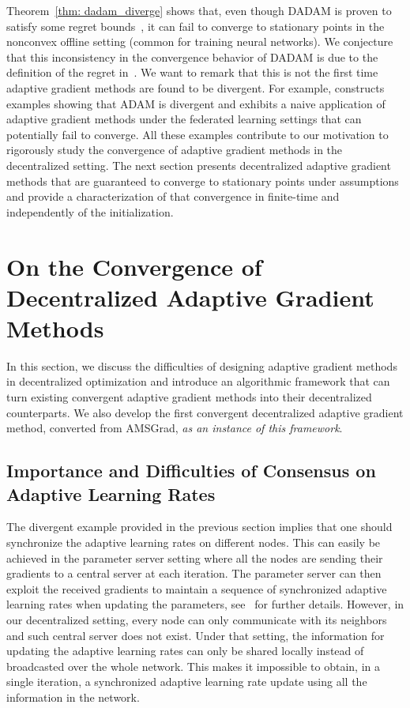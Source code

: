 \documentclass[11pt]{article}
\begin{document}
Theorem~\ref{thm: dadam_diverge} shows that, even though DADAM is proven to satisfy some regret bounds~\citep{nazari2019dadam}, it can fail to converge to stationary points in the nonconvex offline setting (common for training neural networks). 
We conjecture that this inconsistency in the convergence behavior of DADAM is due to the definition of the regret in~\citet{nazari2019dadam}. We want to remark that this is not the first time adaptive gradient methods are found to be divergent. 
For example, \citet{reddi2019convergence} constructs examples showing that ADAM is divergent and \citet{chen2020toward} exhibits a naive application of adaptive gradient methods under the federated learning settings that can potentially fail to converge. 
All these examples contribute to our motivation to rigorously study the convergence of adaptive gradient methods in the decentralized setting. 
The next section presents decentralized adaptive gradient methods that are guaranteed to converge to stationary points under  assumptions and provide a characterization of that convergence in finite-time and independently of the initialization.


\section{On the Convergence of Decentralized Adaptive Gradient Methods}\label{sec:main}


In this section, we discuss the difficulties of designing adaptive gradient methods in decentralized optimization and introduce an algorithmic framework that can turn existing convergent adaptive gradient methods into their decentralized counterparts. 
We also develop the first convergent decentralized adaptive gradient method, converted from AMSGrad, \emph{as an instance of this  framework}.


\subsection{Importance and Difficulties of Consensus on Adaptive Learning Rates}


The divergent example provided in the previous section implies that one should synchronize the adaptive learning rates on different nodes. 
This can easily be achieved in the parameter server setting where all the nodes are sending their gradients to a central server at each iteration.
The parameter server can then exploit the received gradients to maintain a sequence of synchronized adaptive learning rates when updating the parameters, see~\cite{reddi2020adaptive} for further details.
However, in our decentralized setting, every node can only communicate with its neighbors and such central server does not exist.
Under that setting, the information for updating the adaptive learning rates can only be shared locally instead of broadcasted over the whole network.
This makes it impossible to obtain, in a single iteration, a synchronized adaptive learning rate update using all the information in the network. 
\end{document}
